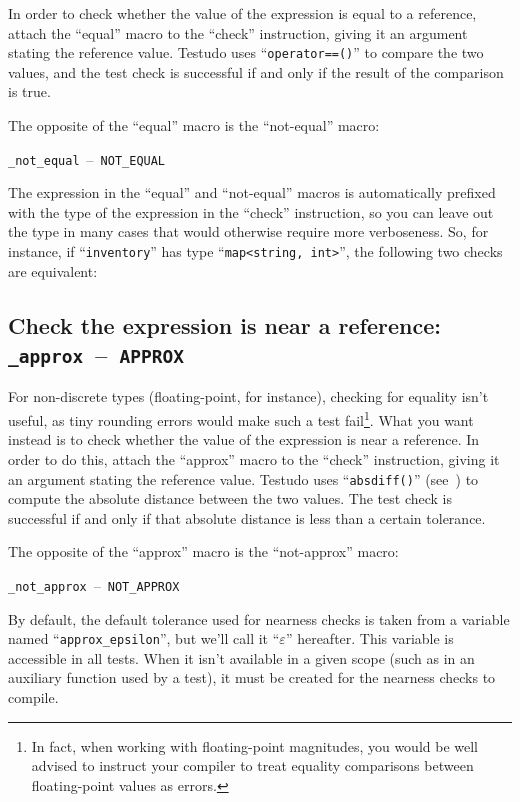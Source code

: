 \documentclass[twoside, a4paper, article]{memoir}
\newcommand*\testudocolor{\color{red!80!blue}}
\newcommand*\testudo[1]{\texttt{\testudocolor{}#1}}
\newcommand*\testudopair[2]{\testudo{#1}~--~\testudo{#2}}
\newcommand\subsectiontestudopair[3]{%
  \subsection[#1]{#1: \testudopair{#2}{#3}}}
\providecommand\typesetexample[1]{%
}
\begin{document}
In order to check whether the value of the expression is equal to a reference,
attach the ``equal'' macro to the ``check'' instruction, giving it an argument
stating the reference value.  Testudo uses ``\texttt{operator==()}'' to
compare the two values, and the test check is successful if and only if the
result of the comparison is true.

\typesetexample{check-equal}

The opposite of the ``equal'' macro is the ``not-equal'' macro:
\begin{center}
  \testudopair{\_not\_equal}{NOT\_EQUAL}
\end{center}

The expression in the ``equal'' and ``not-equal'' macros is automatically
prefixed with the type of the expression in the ``check'' instruction, so you
can leave out the type in many cases that would otherwise require more
verboseness.  So, for instance, if ``\texttt{inventory}'' has type
``\texttt{map<string, int>}'', the following two checks are equivalent:

\typesetexample{check-equal-automatic-type}


\subsectiontestudopair{Check the expression is near a reference}%
  {\_approx}{APPROX}
\label{sec:check-expression-near-reference}

For non-discrete types (floating-point, for instance), checking for equality
isn't useful, as tiny rounding errors would make such a test fail\footnote{In
  fact, when working with floating-point magnitudes, you would be well advised
  to instruct your compiler to treat equality comparisons between
  floating-point values as errors.}.  What you want instead is to check whether
the value of the expression is near a reference.  In order to do this, attach
the ``approx'' macro to the ``check'' instruction, giving it an argument
stating the reference value.  Testudo uses ``\texttt{absdiff()}''
(see~) to compute the absolute distance
between the two values.  The test check is successful if and only if that
absolute distance is less than a certain tolerance.

\typesetexample{check-approx}

The opposite of the ``approx'' macro is the ``not-approx'' macro:
\begin{center}
  \testudopair{\_not\_approx}{NOT\_APPROX}
\end{center}

By default, the default tolerance used for nearness checks is taken from a
variable named ``\texttt{approx\_epsilon}'', but we'll call it
``$\varepsilon$'' hereafter.  This variable is accessible in all tests.  When
it isn't available in a given scope (such as in an auxiliary function used by a
test), it must be created for the nearness checks to compile.
\end{document}
